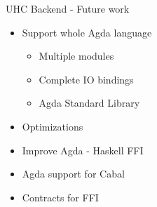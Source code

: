 \begin{frame}{UHC Backend - Future work}
\begin{itemize}
\item Support whole Agda language
  \begin{itemize}
  \item Multiple modules
  \item Complete IO bindings
  \item Agda Standard Library
  \end{itemize}
\item Optimizations
\item Improve Agda - Haskell FFI
\item Agda support for Cabal
\item Contracts for FFI
\end{itemize}
\end{frame}
